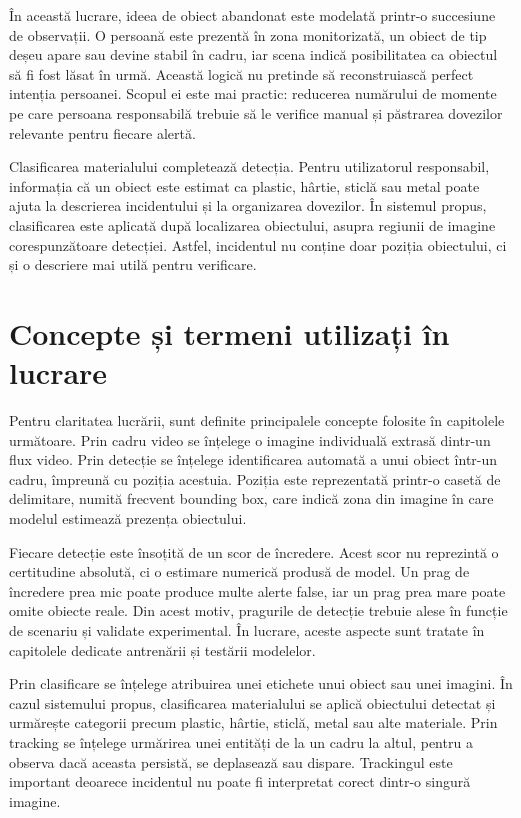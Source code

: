 În această lucrare, ideea de obiect abandonat este modelată printr-o succesiune de observații. O persoană este prezentă în zona monitorizată, un obiect de tip deșeu apare sau devine stabil în cadru, iar scena indică posibilitatea ca obiectul să fi fost lăsat în urmă. Această logică nu pretinde să reconstruiască perfect intenția persoanei. Scopul ei este mai practic: reducerea numărului de momente pe care persoana responsabilă trebuie să le verifice manual și păstrarea dovezilor relevante pentru fiecare alertă.

Clasificarea materialului completează detecția. Pentru utilizatorul responsabil, informația că un obiect este estimat ca plastic, hârtie, sticlă sau metal poate ajuta la descrierea incidentului și la organizarea dovezilor. În sistemul propus, clasificarea este aplicată după localizarea obiectului, asupra regiunii de imagine corespunzătoare detecției. Astfel, incidentul nu conține doar poziția obiectului, ci și o descriere mai utilă pentru verificare.

\section{Concepte și termeni utilizați în lucrare}

Pentru claritatea lucrării, sunt definite principalele concepte folosite în capitolele următoare. Prin cadru video se înțelege o imagine individuală extrasă dintr-un flux video. Prin detecție se înțelege identificarea automată a unui obiect într-un cadru, împreună cu poziția acestuia. Poziția este reprezentată printr-o casetă de delimitare, numită frecvent bounding box, care indică zona din imagine în care modelul estimează prezența obiectului.

Fiecare detecție este însoțită de un scor de încredere. Acest scor nu reprezintă o certitudine absolută, ci o estimare numerică produsă de model. Un prag de încredere prea mic poate produce multe alerte false, iar un prag prea mare poate omite obiecte reale. Din acest motiv, pragurile de detecție trebuie alese în funcție de scenariu și validate experimental. În lucrare, aceste aspecte sunt tratate în capitolele dedicate antrenării și testării modelelor.

Prin clasificare se înțelege atribuirea unei etichete unui obiect sau unei imagini. În cazul sistemului propus, clasificarea materialului se aplică obiectului detectat și urmărește categorii precum plastic, hârtie, sticlă, metal sau alte materiale. Prin tracking se înțelege urmărirea unei entități de la un cadru la altul, pentru a observa dacă aceasta persistă, se deplasează sau dispare. Trackingul este important deoarece incidentul nu poate fi interpretat corect dintr-o singură imagine.

